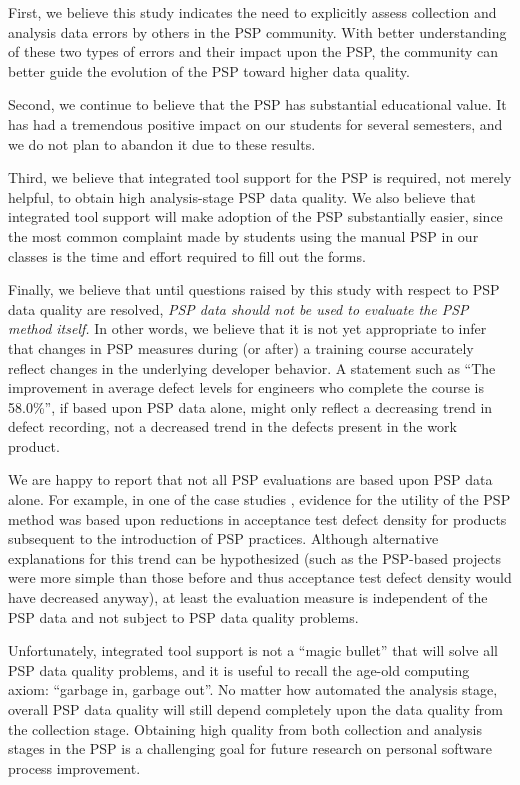 First, we believe this study indicates the need to explicitly assess
collection and analysis data errors by others in the PSP community. With
better understanding of these two types of errors and their impact upon the
PSP, the community can better guide the evolution of the PSP toward higher
data quality.

Second, we continue to believe that the PSP has substantial educational
value. It has had a tremendous positive impact on our students for
several semesters, and we do not plan to abandon it due to these results.

Third, we believe that integrated tool support for the PSP is required, not
merely helpful, to obtain high analysis-stage PSP data quality.  We also
believe that integrated tool support will make adoption of the PSP
substantially easier, since the most common complaint made by students
using the manual PSP in our classes is the time and effort required to fill
out the forms.


Finally, we believe that until questions raised by this study with respect
to PSP data quality are resolved, {\em PSP data should not be used to
  evaluate the PSP method itself.} In other words, we believe that it is
not yet appropriate to infer that changes in PSP measures during (or after) a
training course accurately reflect changes in the underlying developer
behavior.  A statement such as ``The improvement in average defect levels
for engineers who complete the course is 58.0\%'', if based upon PSP data
alone, might only reflect a decreasing trend in defect recording, not a
decreased trend in the defects present in the work product.

We are happy to report that not all PSP evaluations are based upon PSP data
alone. For example, in one of the case studies \cite{Ferguson97}, evidence
for the utility of the PSP method was based upon reductions in acceptance
test defect density for products subsequent to the introduction of PSP
practices.  Although alternative explanations for this trend can be
hypothesized (such as the PSP-based projects were more simple than those
before and thus acceptance test defect density would have decreased
anyway), at least the evaluation measure is independent of the PSP data
and not subject to PSP data quality problems.

Unfortunately, integrated tool support is not a ``magic bullet'' that
will solve all PSP data quality problems, and it is useful to 
recall the age-old computing axiom: ``garbage in, garbage out''.
No matter how automated the analysis stage, overall PSP data quality will
still depend completely upon the data quality from the collection stage.
Obtaining high quality from both collection and analysis stages in
the PSP is a challenging goal for future research on personal software
process improvement.


